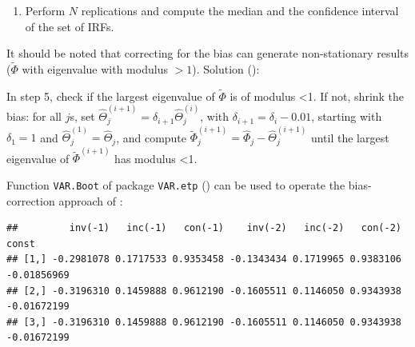 \documentclass[
  12pt,
]{book}
\newenvironment{Shaded}{\begin{snugshade}}{\end{snugshade}}
\newcommand{\AttributeTok}[1]{\textcolor[rgb]{0.77,0.63,0.00}{#1}}
\newcommand{\CommentTok}[1]{\textcolor[rgb]{0.56,0.35,0.01}{\textit{#1}}}
\newcommand{\DecValTok}[1]{\textcolor[rgb]{0.00,0.00,0.81}{#1}}
\newcommand{\FunctionTok}[1]{\textcolor[rgb]{0.00,0.00,0.00}{#1}}
\newcommand{\NormalTok}[1]{#1}
\newcommand{\OtherTok}[1]{\textcolor[rgb]{0.56,0.35,0.01}{#1}}
\newcommand{\SpecialCharTok}[1]{\textcolor[rgb]{0.00,0.00,0.00}{#1}}
\newcommand{\StringTok}[1]{\textcolor[rgb]{0.31,0.60,0.02}{#1}}
\providecommand{\tightlist}{%
  \setlength{\itemsep}{0pt}\setlength{\parskip}{0pt}}
\theoremstyle{definition}
\theoremstyle{definition}
\theoremstyle{definition}
\theoremstyle{definition}
\theoremstyle{remark}
\begin{document}
\begin{enumerate}
\def\labelenumi{\arabic{enumi}.}
\setcounter{enumi}{6}
\tightlist
\item
  Perform \(N\) replications and compute the median and the confidence interval of the set of IRFs.
\end{enumerate}

It should be noted that correcting for the bias can generate non-stationary results (\(\tilde \Phi\) with eigenvalue with modulus \(>1\)). Solution (\citet{Kilian_1998}):

In step 5, check if the largest eigenvalue of \(\tilde\Phi\) is of modulus \textless1.
If not, shrink the bias: for all \(j\)s, set \(\widehat{\Theta}_j^{(i+1)}=\delta_{i+1}\widehat{\Theta}_j^{(i)}\), with \(\delta_{i+1}=\delta_i-0.01\), starting with \(\delta_1=1\) and \(\widehat{\Theta}_j^{(1)} =\widehat{\Theta}_j\), and compute \(\widetilde{\Phi}_j^{(i+1)}=\widehat{\Phi}_j-\widehat{\Theta}_j^{(i+1)}\) until the largest eigenvalue of \(\tilde\Phi^{(i+1)}\) has modulus \textless1.

Function \texttt{VAR.Boot} of package \texttt{VAR.etp} (\citet{VARetp}) can be used to operate the bias-correction approach of \citet{Kilian_1998}:

\begin{Shaded}
\end{Shaded}

\begin{verbatim}
##         inv(-1)   inc(-1)   con(-1)    inv(-2)   inc(-2)   con(-2)       const
## [1,] -0.2981078 0.1717533 0.9353458 -0.1343434 0.1719965 0.9383106 -0.01856969
## [2,] -0.3196310 0.1459888 0.9612190 -0.1605511 0.1146050 0.9343938 -0.01672199
## [3,] -0.3196310 0.1459888 0.9612190 -0.1605511 0.1146050 0.9343938 -0.01672199
\end{verbatim}
\end{document}
